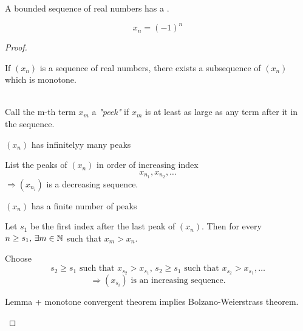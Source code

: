 \documentclass[a4paper,12pt]{article}
\begin{document}
\begin{theorem}
    A bounded sequence of real numbers has a .
    \begin{example}
        \[x_n = (-1)^n\]
    \end{example}
    \begin{proof}
        \begin{lemma}
            If \((x_n)\) is a sequence of real numbers, there exists a subsequence of \((x_n)\) which is monotone.
        \end{lemma}
        \\
        Call the m-th term \(x_m\) a \textit{"peek"} if \(x_m\) is at least as large as any term after it in the sequence.
        
        \begin{center}
        \end{center}

        \((x_n)\) has infinitelyy many peaks

        List the peaks of \((x_n)\) in order of increasing index \[x_{n_1},x_{n_2},\dots\]
        \(\Rightarrow (x_{n_i})\) is a decreasing sequence.

        \((x_n)\) has a finite number of peaks

        Let \(s_1\) be the first index after the last peak of \((x_n)\). Then for every \(n\ge s_1, \,\exists m\in\mathbb{N}\) such that \(x_m>x_n\).

        Choose \[s_2\ge s_1\text{ such that } x_{s_2}>x_{s_1},\, s_2\ge s_1\text{ such that } x_{s_2}>x_{s_1},\dots\]
        \[\Rightarrow (x_{s_i}) \text{ is an increasing sequence.}\]
        \begin{remark}
            Lemma + monotone convergent theorem implies Bolzano-Weierstrass theorem.
        \end{remark}


\end{proof}
\end{theorem}
\end{document}
